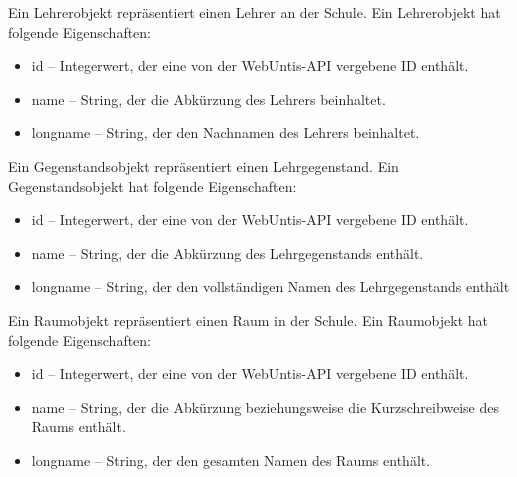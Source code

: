 Ein Lehrerobjekt repräsentiert einen Lehrer an der Schule. Ein Lehrerobjekt hat folgende Eigenschaften: 

\begin{itemize}
    \item id -- Integerwert, der eine von der WebUntis-API vergebene ID enthält.
    \item name -- String, der die Abkürzung des Lehrers beinhaltet.
    \item longname -- String, der den Nachnamen des Lehrers beinhaltet. 
\end{itemize}


Ein Gegenstandsobjekt repräsentiert einen Lehrgegenstand. Ein Gegenstandsobjekt hat folgende Eigenschaften: 

\begin{itemize}
    \item id -- Integerwert, der eine von der WebUntis-API vergebene ID enthält. 
    \item name -- String, der die Abkürzung des Lehrgegenstands enthält.
    \item longname -- String, der den vollständigen Namen des Lehrgegenstands enthält
\end{itemize}


\pagebreak

Ein Raumobjekt repräsentiert einen Raum in der Schule. Ein Raumobjekt hat folgende Eigenschaften: 

\begin{itemize}
    \item id -- Integerwert, der eine von der WebUntis-API vergebene ID enthält.
    \item name -- String, der die Abkürzung beziehungsweise die Kurzschreibweise des Raums enthält.
    \item longname -- String, der den gesamten Namen des Raums enthält. 
\end{itemize}